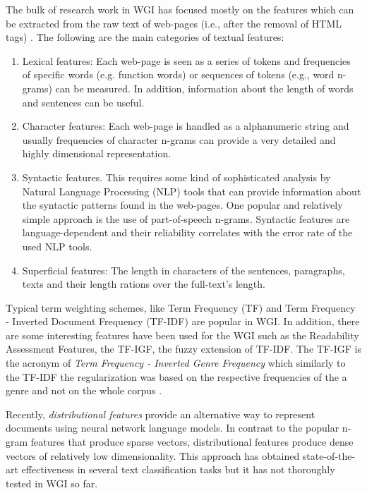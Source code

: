 The bulk of research work in WGI has focused mostly on the features which can be extracted from the raw text of web-pages (i.e., after the removal of HTML tags) \parencite{mason2009classifying,sharoff2010web,Sharroff2010,Nooralahzadeh2014,onan2018ensemble}. The following are the main categories of textual features: 

\begin{enumerate}
\item Lexical features: Each web-page is seen as a series of tokens and frequencies of specific words (e.g. function words) or sequences of tokens (e.g., word n-grams) can be measured. In addition, information about the length of words and sentences can be useful.
\item Character features: Each web-page is handled as a alphanumeric string and usually frequencies of character n-grams can provide a very detailed and highly dimensional representation. 
\item Syntactic features. This requires some kind of sophisticated analysis by Natural Language Processing (NLP) tools that can provide information about the syntactic patterns found in the web-pages. One popular and relatively simple approach is the use of part-of-speech n-grams. Syntactic features are language-dependent and their reliability correlates with the error rate of the used NLP tools.
\item Superficial features: The length in characters of the sentences, paragraphs, texts and their length rations over the full-text's length.
\end{enumerate}

Typical term weighting schemes, like Term Frequency (TF) and Term Frequency - Inverted Document Frequency (TF-IDF) are popular in WGI. In addition, there are some interesting features have been used for the WGI such as the Readability Assessment Features, the TF-IGF, the fuzzy extension of TF-IDF. The TF-IGF is the acronym of \textit{Term Frequency - Inverted Genre Frequency} which similarly to the TF-IDF the regularization was based on the respective frequencies of the a genre and not on the whole corpus \parencite{sugiyanto2014term,}.

Recently, \textit{distributional features} provide an alternative way to represent documents using neural network language models. In contrast to the popular n-gram features that produce sparse vectors, distributional features produce dense vectors of relatively low dimensionality. This approach has obtained state-of-the-art effectiveness in several text classification tasks but it has not thoroughly tested in WGI so far. 

